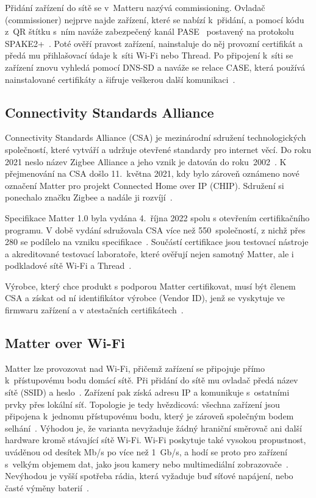 Přidání zařízení do sítě se v~Matteru nazývá commissioning. Ovladač
(commissioner) nejprve najde zařízení, které se nabízí k~přidání, a pomocí
kódu z~QR štítku s~ním naváže zabezpečený kanál PASE~\cite{google-matter-commissioning}
postavený na protokolu SPAKE2+~\cite{silabs-matter-security}. Poté ověří pravost
zařízení, nainstaluje do něj provozní certifikát a předá mu přihlašovací údaje
k~síti Wi-Fi nebo Thread. Po připojení k~síti se zařízení znovu vyhledá pomocí
DNS-SD a naváže se relace CASE, která používá nainstalované certifikáty
a šifruje veškerou další komunikaci~\cite{google-matter-commissioning}.


\subsection{Connectivity Standards Alliance}
Connectivity Standards Alliance (CSA) je mezinárodní sdružení technologických
společností, které vytváří a udržuje otevřené standardy pro internet věcí.
Do roku 2021 neslo název Zigbee Alliance a jeho vznik je datován do
roku~2002~\cite{csa-matter-arrives}. K přejmenování na CSA došlo
11.~května 2021, kdy bylo zároveň oznámeno nové označení Matter pro
projekt Connected Home over IP (CHIP). Sdružení si ponechalo značku
Zigbee a nadále ji rozvíjí~\cite{csa-rebrand}.

Specifikace Matter 1.0 byla vydána 4.~října 2022 spolu s otevřením
certifikačního programu. V době vydání sdružovala CSA více než
550~společností, z nichž přes 280 se podílelo na vzniku
specifikace~\cite{csa-matter-arrives}. Součástí certifikace jsou testovací
nástroje a akreditované testovací laboratoře, které ověřují nejen samotný
Matter, ale i podkladové sítě Wi-Fi a Thread~\cite{csa-matter-arrives}.

Výrobce, který chce produkt s podporou Matter certifikovat, musí být členem
CSA a získat od ní identifikátor výrobce (Vendor ID), jenž se vyskytuje ve
firmwaru zařízení a v atestačních certifikátech~\cite{matter-handbook}.


\subsection{Matter over Wi-Fi}

Matter lze provozovat nad Wi-Fi, přičemž zařízení se připojuje přímo k~přístupovému
bodu domácí sítě. Při přidání do sítě mu ovladač předá název sítě (SSID)
a heslo~\cite{silabs-matter-commissioning}. Zařízení pak získá adresu IP
a komunikuje s~ostatními prvky přes lokální síť. Topologie je tedy hvězdicová:
všechna zařízení jsou připojena k~jednomu přístupovému bodu, který je zároveň
společným bodem selhání~\cite{quectel-matter-wifi-thread}. Výhodou je, že
varianta nevyžaduje žádný hraniční směrovač ani další hardware kromě stávající
sítě Wi-Fi. Wi-Fi poskytuje také vysokou propustnost, uváděnou od desítek Mb/s
po více než 1~Gb/s, a hodí se proto pro zařízení s~velkým objemem dat, jako jsou
kamery nebo multimediální zobrazovače~\cite{quectel-matter-wifi-thread}.
Nevýhodou je vyšší spotřeba rádia, která vyžaduje buď síťové napájení, nebo
časté výměny baterií~\cite{quectel-matter-wifi-thread}.

